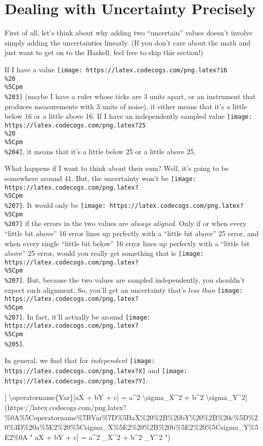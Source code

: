 \documentclass[]{article}
\begin{document}
\hypertarget{dealing-with-uncertainty-precisely}{%
\section{Dealing with Uncertainty
Precisely}\label{dealing-with-uncertainty-precisely}}

First of all, let's think about why adding two ``uncertain'' values doesn't
involve simply adding the uncertainties linearly. (If you don't care about the
math and just want to get on to the Haskell, feel free to skip this section!)

If I have a value
\texttt{[image: https://latex.codecogs.com/png.latex?16\\\%20\\\%5Cpm\\\%203]} (maybe
I have a ruler whose ticks are 3 units apart, or an instrument that produces
measurements with 3 units of noise), it either means that it's a little below 16
or a little above 16. If I have an independently sampled value
\texttt{[image: https://latex.codecogs.com/png.latex?25\\\%20\\\%5Cpm\\\%204]}, it
means that it's a little below 25 or a little above 25.

What happens if I want to think about their sum? Well, it's going to be
somewhere around 41. But, the uncertainty won't be
\texttt{[image: https://latex.codecogs.com/png.latex?\\\%5Cpm\\\%207]}. It would
only be \texttt{[image: https://latex.codecogs.com/png.latex?\\\%5Cpm\\\%207]} if
the errors in the two values are \emph{always aligned}. Only if or when every
``little bit above'' 16 error lines up perfectly with a ``little bit above'' 25
error, and when every single ``little bit below'' 16 error lines up perfectly
with a ``little bit above'' 25 error, would you really get something that is
\texttt{[image: https://latex.codecogs.com/png.latex?\\\%5Cpm\\\%207]}. But, because
the two values are sampled independently, you shouldn't expect such alignment.
So, you'll get an uncertainty that's \emph{less than}
\texttt{[image: https://latex.codecogs.com/png.latex?\\\%5Cpm\\\%207]}. In fact,
it'll actually be around
\texttt{[image: https://latex.codecogs.com/png.latex?\\\%5Cpm\\\%205]}.

In general, we find that for \emph{independent}
\texttt{[image: https://latex.codecogs.com/png.latex?X]} and
\texttt{[image: https://latex.codecogs.com/png.latex?Y]}:

{[} \textbackslash{}operatorname\{Var\}{[}aX + bY + c{]} = a\^{}2
\textbackslash{}sigma\_X\^{}2 + b\^{}2
\textbackslash{}sigma\_Y\^{}2{]}(https://latex.codecogs.com/png.latex?\%0A\%5Coperatorname\%7BVar\%7D\%5BaX\%20\%2B\%20bY\%20\%2B\%20c\%5D\%20\%3D\%20a\%5E2\%20\%5Csigma\_X\%5E2\%20\%2B\%20b\%5E2\%20\%5Csigma\_Y\%5E2\%0A
" \operatorname{Var}{[}aX + bY + c{]} = a\^{}2 \sigma\_X\^{}2 + b\^{}2
\sigma\_Y\^{}2 ")
\end{document}
